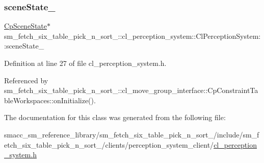 \subsubsection{\texorpdfstring{scene\+State\+\_\+}{sceneState\_}}
{\footnotesize\ttfamily \hyperlink{classsm__fetch__six__table__pick__n__sort__1_1_1cl__perception__system_1_1CpSceneState}{Cp\+Scene\+State}$\ast$ sm\+\_\+fetch\+\_\+six\+\_\+table\+\_\+pick\+\_\+n\+\_\+sort\+\_\+::cl\+\_\+perception\+\_\+system\+::\+Cl\+Perception\+System\+::scene\+State\+\_\+}



Definition at line 27 of file cl\+\_\+perception\+\_\+system.\+h.



Referenced by sm\+\_\+fetch\+\_\+six\+\_\+table\+\_\+pick\+\_\+n\+\_\+sort\+\_\+::cl\+\_\+move\+\_\+group\+\_\+interface\+::\+Cp\+Constraint\+Table\+Workspaces\+::on\+Initialize().



The documentation for this class was generated from the following file\+:\begin{DoxyCompactItemize}
\item 
smacc\+\_\+sm\+\_\+reference\+\_\+library/sm\+\_\+fetch\+\_\+six\+\_\+table\+\_\+pick\+\_\+n\+\_\+sort\+\_/include/sm\+\_\+fetch\+\_\+six\+\_\+table\+\_\+pick\+\_\+n\+\_\+sort\+\_/clients/perception\+\_\+system\+\_\+client/\hyperlink{sm__fetch__six__table__pick__n__sort__1_2include_2sm__fetch__six__table__pick__n__sort__1_2clien27a9ac326023dd544febf310659c804a}{cl\+\_\+perception\+\_\+system.\+h}\end{DoxyCompactItemize}

